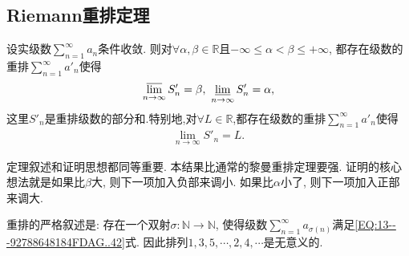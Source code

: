 \documentclass[../../main.tex]{subfiles}%
\begin{document}
\subsection{Riemann重排定理}

\begin{theorem}[Riemann重排定理]\label{theorem:Riemann重排定理}
设实级数$\sum\limits_{n=1}^{\infty}a_n$条件收敛. 则对$\forall \alpha,\beta\in \mathbb{R}$且$-\infty\leqslant\alpha<\beta\leqslant+\infty$, 都存在级数的重排$\sum\limits_{n=1}^{\infty}a'_n$使得
\begin{align}\label{EQ:13---92788648184FDAG..42}
\varlimsup_{n\to\infty}S'_n=\beta,\ \varliminf_{n\to\infty}S'_n=\alpha,
\end{align}
这里$S'_n$是重排级数的部分和.特别地,对$\forall L\in\mathbb{R}$,都存在级数的重排$\sum\limits_{n=1}^{\infty}a'_n$使得
\begin{align*}
\underset{n\rightarrow \infty}{\lim}S'_n=L.
\end{align*}
\end{theorem}
\begin{note}
定理叙述和证明思想都同等重要. 本结果比通常的黎曼重排定理要强. 证明的核心想法就是如果比$\beta$大, 则下一项加入负部来调小. 如果比$\alpha$小了, 则下一项加入正部来调大.
\end{note}
\begin{remark}
重排的严格叙述是: 存在一个双射$\sigma:\mathbb{N}\to\mathbb{N}$, 使得级数$\sum\limits_{n=1}^{\infty}a_{\sigma(n)}$满足\eqref{EQ:13---92788648184FDAG..42}式.
因此排列$1,3,5,\cdots,2,4,\cdots$是无意义的.
\end{remark}
\end{document}
